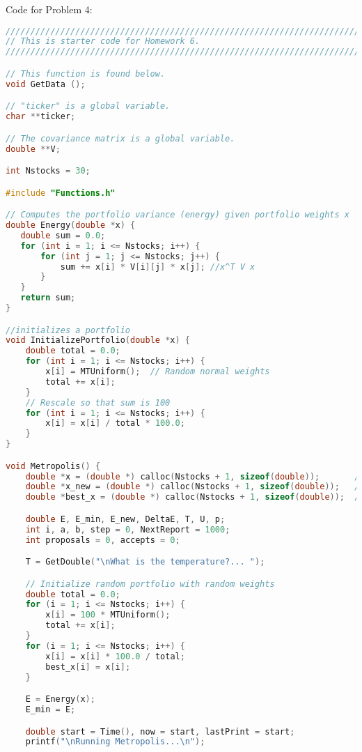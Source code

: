 \documentclass{report}
\begin{document}
Code for Problem 4:

\begin{lstlisting}[language=c++]
////////////////////////////////////////////////////////////////////////////////
// This is starter code for Homework 6.
////////////////////////////////////////////////////////////////////////////////

// This function is found below.
void GetData ();

// "ticker" is a global variable.
char **ticker;

// The covariance matrix is a global variable.
double **V;

int Nstocks = 30;

#include "Functions.h"

// Computes the portfolio variance (energy) given portfolio weights x
double Energy(double *x) {
   double sum = 0.0;
   for (int i = 1; i <= Nstocks; i++) {
       for (int j = 1; j <= Nstocks; j++) {
           sum += x[i] * V[i][j] * x[j]; //x^T V x
       }
   }
   return sum;
}

//initializes a portfolio
void InitializePortfolio(double *x) {
    double total = 0.0;
    for (int i = 1; i <= Nstocks; i++) {
        x[i] = MTUniform();  // Random normal weights
        total += x[i];
    }
    // Rescale so that sum is 100
    for (int i = 1; i <= Nstocks; i++) {
        x[i] = x[i] / total * 100.0;
    }
}

void Metropolis() {
    double *x = (double *) calloc(Nstocks + 1, sizeof(double));       // current portfolio
    double *x_new = (double *) calloc(Nstocks + 1, sizeof(double));   // proposed neighbor
    double *best_x = (double *) calloc(Nstocks + 1, sizeof(double));  // best found

    double E, E_min, E_new, DeltaE, T, U, p;
    int i, a, b, step = 0, NextReport = 1000;
    int proposals = 0, accepts = 0;

    T = GetDouble("\nWhat is the temperature?... ");

    // Initialize random portfolio with random weights
    double total = 0.0;
    for (i = 1; i <= Nstocks; i++) {
        x[i] = 100 * MTUniform();
        total += x[i];
    }
    for (i = 1; i <= Nstocks; i++) {
        x[i] = x[i] * 100.0 / total;
        best_x[i] = x[i];
    }

    E = Energy(x);
    E_min = E;

    double start = Time(), now = start, lastPrint = start;
    printf("\nRunning Metropolis...\n");


\end{lstlisting}
\end{document}
